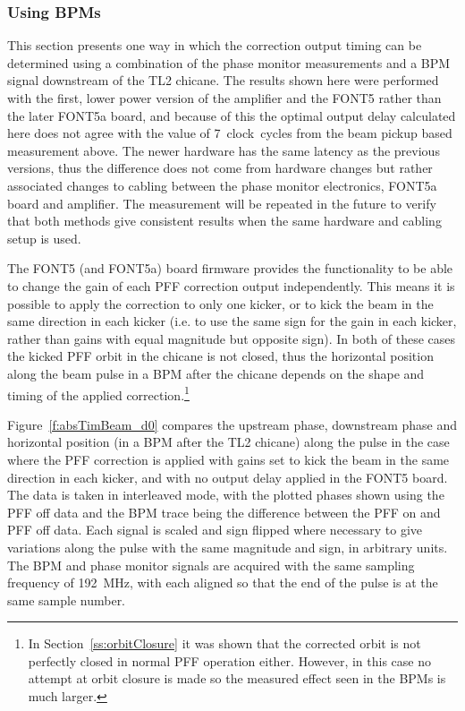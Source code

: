 \subsubsection{Using BPMs}
\label{sss:relativeBPM}

This section presents one way in which the correction output timing can be determined using a combination of the phase monitor measurements and a BPM signal downstream of the TL2 chicane. The results shown here were performed with the first, lower power version of the amplifier and the FONT5 rather than the later FONT5a board, and because of this the optimal output delay calculated here does not agree with the value of 7~clock~cycles from the beam pickup based measurement above. The newer hardware has the same latency as the previous versions, thus the difference does not come from hardware changes but rather associated changes to cabling between the phase monitor electronics, FONT5a board and amplifier. The measurement will be repeated in the future to verify that both methods give consistent results when the same hardware and cabling setup is used.

The FONT5 (and FONT5a) board firmware provides the functionality to be able to change the gain of each PFF correction output independently. This means it is possible to apply the correction to only one kicker, or to kick the beam in the same direction in each kicker (i.e. to use the same sign for the gain in each kicker, rather than gains with equal magnitude but opposite sign). In both of these cases the kicked PFF orbit in the chicane is not closed, thus the horizontal position along the beam pulse in a BPM after the chicane depends on the shape and timing of the applied correction.\footnote{In Section~\ref{ss:orbitClosure} it was shown that the corrected orbit is not perfectly closed in normal PFF operation either. However, in this case no attempt at orbit closure is made so the measured effect seen in the BPMs is much larger.}

Figure~\ref{f:absTimBeam_d0} compares the upstream phase, downstream phase and horizontal position (in a BPM after the TL2 chicane) along the pulse in the case where the PFF correction is applied with gains set to kick the beam in the same direction in each kicker, and with no output delay applied in the FONT5 board. The data is taken in interleaved mode, with the plotted phases shown using the PFF off data and the BPM trace being the difference between the PFF on and PFF off data. Each signal is scaled and sign flipped where necessary to give variations along the pulse with the same magnitude and sign, in arbitrary units. The BPM and phase monitor signals are acquired with the same sampling frequency of 192~MHz, with each aligned so that the end of the pulse is at the same sample number. 

